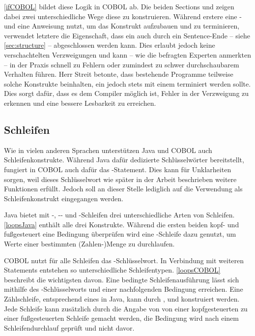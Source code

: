 \autoref{ifCOBOL} bildet diese Logik in COBOL ab. Die beiden Sections  und  zeigen dabei zwei unterschiedliche Wege diese zu konstruieren. Während erstere eine - und eine  Anweisung nutzt, um das Konstrukt aufzubauen und zu terminieren, verwendet letztere die Eigenschaft, dass ein  auch durch ein Sentence-Ende -- siehe \autoref{sec:structure} -- abgeschlossen werden kann. Dies erlaubt jedoch keine verschachtelten Verzweigungen und kann -- wie die befragten Experten anmerkten -- in der Praxis schnell zu Fehlern oder zumindest zu schwer durchschaubarem Verhalten führen. Herr Streit betonte, dass bestehende Programme teilweise solche Konstrukte beinhalten, ein  jedoch stets mit einem  terminiert werden sollte. Dies sorgt dafür, dass es dem Compiler möglich ist, Fehler in der Verzweigung zu erkennen und eine bessere Lesbarkeit zu erreichen.

\subsection{Schleifen}

Wie in vielen anderen Sprachen unterstützen Java und COBOL auch Schleifenkonstrukte. Während Java dafür dedizierte Schlüsselwörter bereitstellt, fungiert in COBOL auch dafür das -Statement. Dies kann für Unklarheiten sorgen, weil dieses Schlüsselwort wie später in der Arbeit beschrieben weitere Funktionen erfüllt. Jedoch soll an dieser Stelle lediglich auf die Verwendung als Schleifenkonstrukt eingegangen werden.

Java bietet mit -, -- und -Schleifen drei unterschiedliche Arten von Schleifen. \autoref{loopsJava} enthält alle drei Konstrukte. Während die ersten beiden kopf- und fußgesteuert eine Bedingung überprüfen wird eine -Schleife \idR dazu genutzt, um Werte einer bestimmten (Zahlen-)Menge zu durchlaufen.


COBOL nutzt für alle Schleifen das -Schlüsselwort. In Verbindung mit weiteren Statements entstehen so unterschiedliche Schleifentypen. \autoref{loopsCOBOL} beschreibt die wichtigsten davon. Eine bedingte Schleifenausführung lässt sich mithilfe des -Schlüsselworts und einer nachfolgenden Bedingung erreichen. Eine Zählschleife, entsprechend eines  in Java, kann durch ,  und  konstruiert werden. Jede Schleife kann zusätzlich durch die Angabe von  von einer kopfgesteuerten zu einer fußgesteuerten Schleife gemacht werden, \dh die Bedingung wird nach einem Schleifendurchlauf geprüft und nicht davor.

